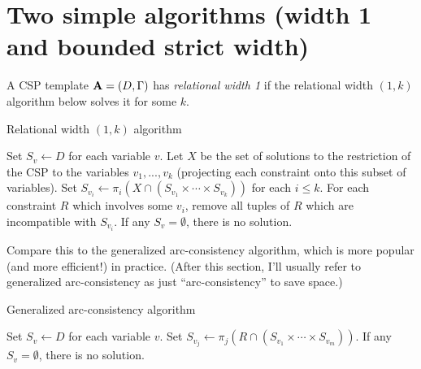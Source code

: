 \documentclass[letterpaper,11pt]{article}
\begin{document}
\section{Two simple algorithms (width 1 and bounded strict width)}

\begin{defn} A CSP template $\mathbf{A} = (D, \Gamma)$ has \emph{relational width 1} if the relational width $(1,k)$ algorithm below solves it for some $k$.
\end{defn}

\begin{algorithm}
\caption{Relational width $(1,k)$ algorithm}
\begin{algorithmic}[1]
\State Set $S_v \gets D$ for each variable $v$.
\Repeat
{}
\State Let $X$ be the set of solutions to the restriction of the CSP to the variables $v_1, ..., v_k$ (projecting each constraint onto this subset of variables).
\State Set $S_{v_i} \gets \pi_i(X \cap (S_{v_1} \times \cdots \times S_{v_k}))$ for each $i \le k$.
\State For each constraint $R$ which involves some $v_i$, remove all tuples of $R$ which are incompatible with $S_{v_i}$.
\EndFor
{}
\State If any $S_v = \emptyset$, there is no solution.
\end{algorithmic}
\end{algorithm}

Compare this to the generalized arc-consistency algorithm, which is more popular (and more efficient!) in practice. (After this section, I'll usually refer to generalized arc-consistency as just ``arc-consistency'' to save space.)

\begin{algorithm}
\caption{Generalized arc-consistency algorithm}
\begin{algorithmic}[1]
\State Set $S_v \gets D$ for each variable $v$.
\State Set $S_{v_j} \gets \pi_j (R \cap (S_{v_1} \times \cdots \times S_{v_m}))$.
\EndWhile
\State If any $S_v = \emptyset$, there is no solution.
\end{algorithmic}
\end{algorithm}
\end{document}
